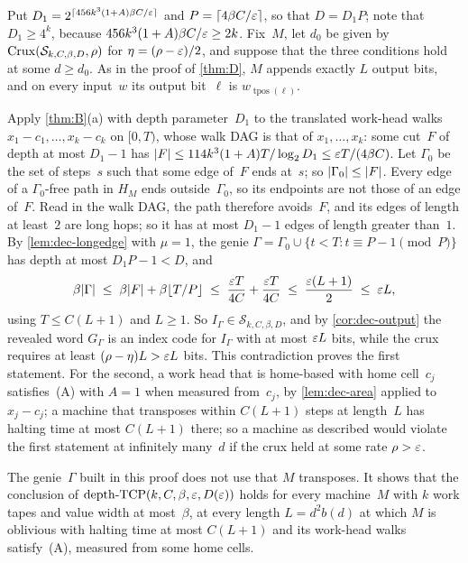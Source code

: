 \begin{informalproof}
Put $D_1=2^{\lceil456k^3(1+A)\beta C/\varepsilon\rceil}$ and $P=\lceil4\beta C/\varepsilon\rceil$, so that $D=D_1P$; note that
$D_1\ge4^k$, because $456k^3(1+A)\beta C/\varepsilon\ge2k$. Fix~$M$, let $d_0$ be given by
$\mathrm{Crux}(\mathcal S_{k,C,\beta,D},\rho)$ for $\eta=(\rho-\varepsilon)/2$, and suppose that the three conditions hold at some
$d\ge d_0$. As in the proof of \cref{thm:D}, $M$ appends exactly $L$ output bits, and on every input~$w$ its output
bit~$\ell$ is $w_{\operatorname{tpos}(\ell)}$.

Apply \cref{thm:B}(a) with depth parameter~$D_1$ to the translated work-head walks $x_1-c_1,\dots,x_k-c_k$ on
$[0,T)$, whose walk DAG is that of $x_1,\dots,x_k$: some cut~$F$ of depth at most $D_1-1$ has
$\lvert F \rvert\le114k^3(1+A)T/\log_2D_1\le\varepsilon T/(4\beta C)$. Let $\Gamma_0$ be the set of
steps~$s$ such that some edge of~$F$ ends at~$s$; so $\lvert \Gamma_0 \rvert\le\lvert F \rvert$. Every edge of a $\Gamma_0$-free path
in $H_M$ ends outside~$\Gamma_0$, so its endpoints are not those of an edge of~$F$. Read in the walk DAG, the path
therefore avoids~$F$, and its edges of length at least~$2$ are long hops; so it has at most $D_1-1$ edges of length
greater than~$1$. By \cref{lem:dec-longedge} with $\mu=1$, the genie
$\Gamma=\Gamma_0\cup\{t<T:t\equiv P-1\pmod P\}$ has depth at most $D_1P-1<D$, and
\[
  \beta\lvert \Gamma \rvert\;\le\;\beta\lvert F \rvert+\beta\lfloor T/P\rfloor\;\le\;\frac{\varepsilon T}{4C}+\frac{\varepsilon T}{4C}
  \;\le\;\frac{\varepsilon(L+1)}2\;\le\;\varepsilon L,
\]
using $T\le C(L+1)$ and $L\ge1$. So $I_\Gamma\in\mathcal S_{k,C,\beta,D}$, and by \cref{cor:dec-output} the revealed
word $G_\Gamma$ is an index code for $I_\Gamma$ with at most $\varepsilon L$ bits, while the crux requires at least
$(\rho-\eta)L>\varepsilon L$ bits. This contradiction proves the first statement. For the second, a work head that is
home-based with home cell~$c_j$ satisfies~(A) with $A=1$ when measured from~$c_j$, by \cref{lem:dec-area} applied to
$x_j-c_j$; a machine that transposes within $C(L+1)$ steps at length~$L$ has halting time at most $C(L+1)$ there; so a
machine as described would violate the first statement at infinitely many~$d$ if the crux held at some rate
$\rho>\varepsilon$.
\end{informalproof}

The genie~$\Gamma$ built in this proof does not use that $M$ transposes. It shows that the conclusion of
$\mathrm{depth}\text{-}\mathrm{TCP}(k,C,\beta,\varepsilon,D(\varepsilon))$ holds for every machine~$M$ with $k$ work tapes and value width at
most~$\beta$, at every length $L=d^2b(d)$ at which $M$ is oblivious with halting time at most $C(L+1)$ and its
work-head walks satisfy~(A), measured from some home cells.

